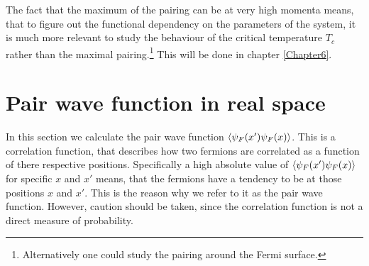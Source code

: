 The fact that the maximum of the pairing can be at very high momenta means, that to figure out the functional dependency on the parameters of the system, it is much more relevant to study the behaviour of the critical temperature $T_c$ rather than the maximal pairing.\footnote{Alternatively one could study the pairing around the Fermi surface.} This will be done in chapter \ref{Chapter6}.

\section{Pair wave function in real space} \label{sec.1wirepairwavefunction}
In this section we calculate the pair wave function $\braket{\psi_F(x')\psi_F(x)}$. This is a correlation function, that describes how two fermions are correlated as a function of there respective positions. Specifically a high absolute value of $\braket{\psi_F(x')\psi_F(x)}$ for specific $x$ and $x'$ means, that the fermions have a tendency to be at those positions $x$ and $x'$. This is the reason why we refer to it as the pair wave function. However, caution should be taken, since the correlation function is not a direct measure of probability. 

